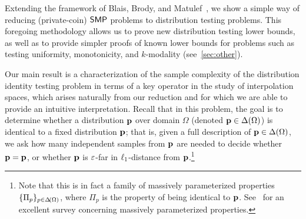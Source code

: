 Extending the framework of Blais, Brody, and Matulef~\cite{BBM:12}, we show a simple way of reducing (private-coin) $\SMP$ problems to distribution testing problems. This foregoing methodology allows us to prove new distribution testing lower bounds, as well as to provide simpler proofs of known lower bounds for problems such as testing uniformity, monotonicity, and $k$-modality (see~\cref{sec:other}). 

Our main result is a characterization of the sample complexity of the distribution identity testing problem in terms of a key operator in the study of interpolation spaces, which arises naturally from our reduction and for which we are able to provide an intuitive interpretation. Recall that in this problem, the goal is to determine whether a distribution $\q$ over domain $\Omega$ (denoted $\q\in\distribs{\Omega}$) is identical to a fixed distribution $\p$; that is, given a full description of $\p\in\distribs{\Omega}$, we ask how many independent samples from $\q$ are needed to decide whether $\q=\p$, or whether $\q$ is $\eps$-far in $\lp[1]$-distance from $\p$.\footnote{Note that this is in fact a family of massively parameterized properties $\{\Pi_p\}_{p\in\distribs{\Omega}}$, where $\Pi_p$ is the property of being identical to $\p$. See~\cite{Newman10} for an excellent survey concerning massively parameterized properties.}

